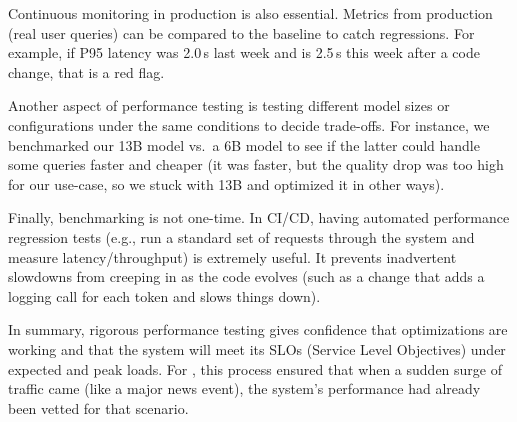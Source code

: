 Continuous monitoring in production is also essential. Metrics from production (real user queries) can be compared to the baseline to catch regressions. For example, if P95 latency was 2.0\,s last week and is 2.5\,s this week after a code change, that is a red flag.

Another aspect of performance testing is testing different model sizes or configurations under the same conditions to decide trade-offs. For instance, we benchmarked our 13B model vs.\ a 6B model to see if the latter could handle some queries faster and cheaper (it was faster, but the quality drop was too high for our use-case, so we stuck with 13B and optimized it in other ways).

Finally, benchmarking is not one-time. In CI/CD, having automated performance regression tests (e.g., run a standard set of requests through the system and measure latency/throughput) is extremely useful. It prevents inadvertent slowdowns from creeping in as the code evolves (such as a change that adds a logging call for each token and slows things down).

In summary, rigorous performance testing gives confidence that optimizations are working and that the system will meet its SLOs (Service Level Objectives) under expected and peak loads. For \ishtar{}, this process ensured that when a sudden surge of traffic came (like a major news event), the system’s performance had already been vetted for that scenario.

